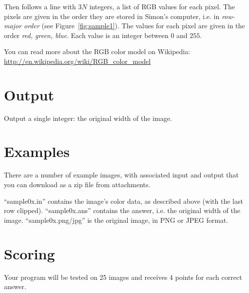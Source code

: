 Then follows a line with $3N$ integers, a list of RGB values for each pixel.
The pixels are given in the order they are stored in Simon's computer, i.e. in \emph{row-major
order} (see Figure~\ref{fig:sample1}). The values for each pixel are given in the order \emph{red,
green, blue}. Each value is an integer between $0$ and $255$.

You can read more about the RGB color model on Wikipedia: \url{http://en.wikipedia.org/wiki/RGB_color_model}

\section*{Output}
Output a single integer: the original width of the image.

\section*{Examples}
There are a number of example images, with associated input and output that you
can download as a zip file from attachments.

``sample0x.in'' contains the image's color data, as described above (with the last row clipped).
``sample0x.ans'' contains the answer, i.e. the original width of the image.
``sample0x.png/jpg'' is the original image, in PNG or JPEG format.

\section*{Scoring}
Your program will be tested on 25 images and receives 4 points for each correct answer.
